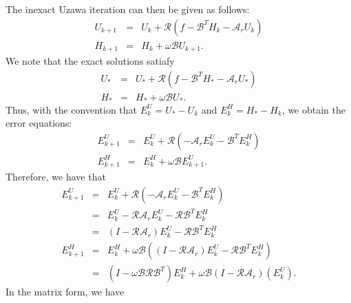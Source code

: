 \documentclass{article}
\theoremstyle{definition}
\begin{document}
The inexact Uzawa iteration can then be given as follows: 
\begin{eqnarray}
U_{k+1} &=& U_k + \mathcal{R} (f - \mathcal{B}^T H_k - \mathcal{A}_r U_k) \\
H_{k+1} &=& H_k + \omega \mathcal{B} U_{k+1}. 
\end{eqnarray}
We note that the exact solutions satiafy \begin{eqnarray}
U_{*} &=& U_{*} + \mathcal{R} (f - \mathcal{B}^T H_{*} - \mathcal{A}_r U_{*}) \\
H_{*} &=& H_{*} + \omega \mathcal{B} U_{*}. 
\end{eqnarray}
Thus, with the convention that $E_{k}^U = U_* - U_k$ and $E_{k}^H = H_* - H_k$, we obtain the error equations: 
\begin{eqnarray}
E^U_{k+1} &=& E^U_k + \mathcal{R}(-\mathcal{A}_r E^U_k - \mathcal{B}^T E^H_k) \\
E^H_{k+1} &=& E^H_k + \omega \mathcal{B} E^U_{k+1}. 
\end{eqnarray}
Therefore, we have that 
\begin{eqnarray}
E^U_{k+1} &=& E^U_k + \mathcal{R}(- \mathcal{A}_r  E^U_k - \mathcal{B}^T E^H_k) \\
          &=& E^U_k - \mathcal{R} \mathcal{A}_r E^U_k - \mathcal{R} \mathcal{B}^T E^H_k \\
          &=& (I - \mathcal{R} \mathcal{A}_r) E^U_k - \mathcal{R} \mathcal{B}^T E_k^H \\ 
E^H_{k+1} &=& E^H_k + \omega \mathcal{B} ((I - \mathcal{R} \mathcal{A}_r) E^U_k - \mathcal{R} \mathcal{B}^T E_k^H ) \\
&=& (I - \omega \mathcal{B} \mathcal{R} \mathcal{B}^T) E_k^H + \omega \mathcal{B} (I - \mathcal{R} \mathcal{A}_r)(E_k^U). 
\end{eqnarray} 
In the matrix form, we have 
\end{document}
